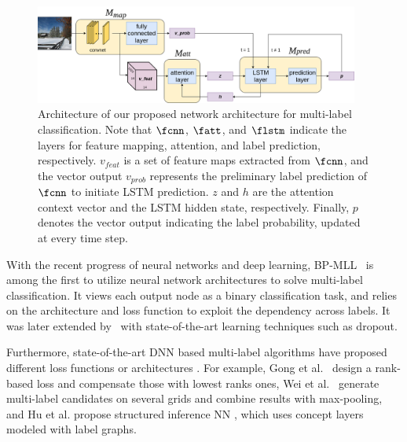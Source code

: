 \documentclass[letterpaper]{article} %
\begin{document}
\begin{figure}[t!]
	\centering
	\includegraphics[width=0.95\textwidth]{./AAAI.png}
	\caption{Architecture of our proposed network architecture for multi-label classification. Note that $\fcnn$, $\fatt$, and $\flstm$ indicate the layers for feature mapping, attention, and label prediction, respectively. $v_{feat}$ is a set of feature maps extracted from $\fcnn$, and the vector output $v_{prob}$ represents the preliminary label prediction of $\fcnn$ to initiate LSTM prediction. $z$ and $h$ are the attention context vector and the LSTM hidden state, respectively. Finally, $p$ denotes the vector output indicating the label probability, updated at every time step.}
	\label{fig:2}
\end{figure}

With the recent progress of neural networks and deep learning, BP-MLL~\cite{zhang2006multilabel} is among the first to utilize neural network architectures to solve multi-label classification. It views each output node as a binary classification task, and relies on the architecture and loss function to exploit the dependency across labels. It was later extended by~\cite{nam2014large} with state-of-the-art learning techniques such as dropout.

Furthermore, state-of-the-art DNN based multi-label algorithms have proposed different loss functions or architectures \cite{gong2013deep,wei2014cnn,hu2016learning}. For example, Gong et al.~\cite{gong2013deep} design a rank-based loss and compensate those with lowest ranks ones, Wei et al.~\cite{wei2014cnn} generate multi-label candidates on several grids and combine results with max-pooling, and Hu et al. propose structured inference NN \cite{hu2016learning}, which uses concept layers modeled with label graphs.
\end{document}
